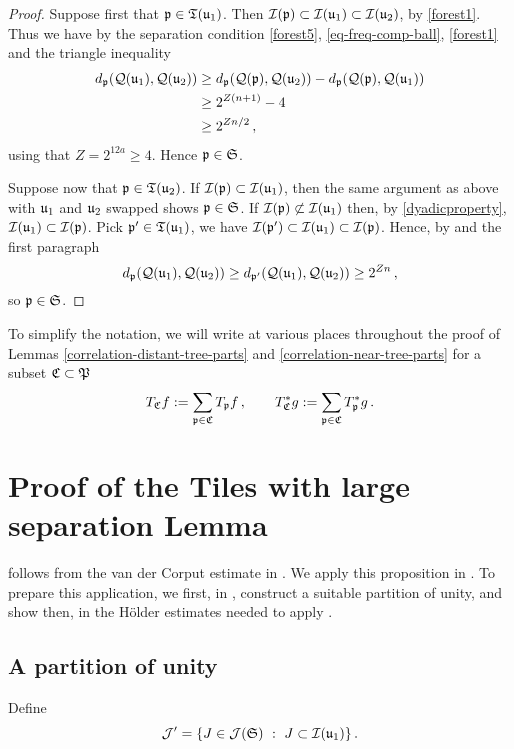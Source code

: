\begin{proof}
    \leanok
    Suppose first that ${\mathfrak p} \in {\mathfrak T}({\mathfrak u}_1)$. Then ${\mathcal{I}}({\mathfrak p}) \subset {\mathcal{I}}({\mathfrak u}_1) \subset {\mathcal{I}}({\mathfrak u}_2)$, by \eqref{forest1}. Thus we have by the separation condition \eqref{forest5}, \eqref{eq-freq-comp-ball}, \eqref{forest1} and the triangle inequality
    \begin{align*}
        d_{{\mathfrak p}}({\mathcal{Q}}({\mathfrak u}_1), {\mathcal{Q}}({\mathfrak u}_2)) &\ge d_{{\mathfrak p}}({\mathcal{Q}}({\mathfrak p}), {\mathcal{Q}}({\mathfrak u}_2)) - d_{{\mathfrak p}}({\mathcal{Q}}({\mathfrak p}), {\mathcal{Q}}({\mathfrak u}_1))\\
        &\ge 2^{Z(n+1)} - 4\\
        &\ge 2^{Zn/2}\,,
    \end{align*}
    using that $Z= 2^{12a}\ge 4$. Hence ${\mathfrak p} \in \mathfrak{S}$.

    Suppose now that ${\mathfrak p} \in {\mathfrak T}({\mathfrak u}_2)$. If ${\mathcal{I}}({\mathfrak p}) \subset {\mathcal{I}}({\mathfrak u}_1)$, then the same argument as above with ${\mathfrak u}_1$ and ${\mathfrak u}_2$ swapped shows ${\mathfrak p} \in \mathfrak{S}$. If ${\mathcal{I}}({\mathfrak p}) \not \subset {\mathcal{I}}({\mathfrak u}_1)$ then, by \eqref{dyadicproperty}, ${\mathcal{I}}({\mathfrak u}_1) \subset {\mathcal{I}}({\mathfrak p})$. Pick ${\mathfrak p}' \in {\mathfrak T}({\mathfrak u}_1)$, we have ${\mathcal{I}}({\mathfrak p}') \subset {\mathcal{I}}({\mathfrak u}_1) \subset {\mathcal{I}}({\mathfrak p})$. Hence, by  and the first paragraph
    $$
        d_{{\mathfrak p}}({\mathcal{Q}}({\mathfrak u}_1), {\mathcal{Q}}({\mathfrak u}_2)) \ge d_{{\mathfrak p}'}({\mathcal{Q}}({\mathfrak u}_1), {\mathcal{Q}}({\mathfrak u}_2)) \ge 2^{Zn}\,,
    $$
    so ${\mathfrak p} \in \mathfrak{S}$.
\end{proof}

To simplify the notation, we will write at various places throughout the proof of Lemmas \ref{correlation-distant-tree-parts} and \ref{correlation-near-tree-parts} for a subset ${\mathfrak C} \subset {\mathfrak P}$
$$
    T_{{\mathfrak C}} f := \sum_{{\mathfrak p} \in {\mathfrak C}} T_{{\mathfrak p}} f\,, \quad\quad T_{{\mathfrak C}}^* g := \sum_{{\mathfrak p}\in{\mathfrak C}} T_{{\mathfrak p}}^* g\,.
$$

\section{Proof of the Tiles with large separation Lemma}
    \label{subsec-big-tiles}

 follows from the van der Corput estimate in . We apply this proposition in . To prepare this application, we first, in , construct a suitable partition of unity, and show then, in  the H\"older estimates needed to apply .

\subsection{A partition of unity}
\label{subsubsec-pao}
    Define
    $$
        \mathcal{J}' = \{J \in \mathcal{J}(\mathfrak{S}) \ : \ J \subset {\mathcal{I}}({\mathfrak u}_1)\}\,.
    $$

